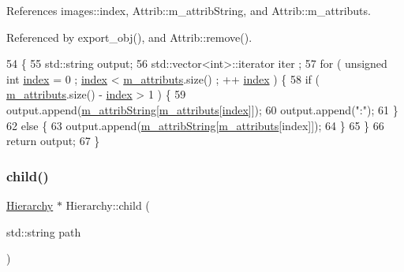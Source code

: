References images\+::index, Attrib\+::m\+\_\+attrib\+String, and Attrib\+::m\+\_\+attributs.



Referenced by export\+\_\+obj(), and Attrib\+::remove().


\begin{DoxyCode}
54                             \{
55   std::string output;
56   std::vector<int>::iterator iter ;
57   \textcolor{keywordflow}{for} ( \textcolor{keywordtype}{unsigned} \textcolor{keywordtype}{int} \hyperlink{namespaceimages_a54407fd574970b3178647ae096321a57}{index} = 0 ; \hyperlink{namespaceimages_a54407fd574970b3178647ae096321a57}{index} < \hyperlink{classAttrib_ac4bd58a0cc6b38a3b711d609a3d3aacc}{m\_attributs}.size() ; ++
      \hyperlink{namespaceimages_a54407fd574970b3178647ae096321a57}{index} ) \{
58     \textcolor{keywordflow}{if} ( \hyperlink{classAttrib_ac4bd58a0cc6b38a3b711d609a3d3aacc}{m\_attributs}.size() - \hyperlink{namespaceimages_a54407fd574970b3178647ae096321a57}{index} > 1 ) \{
59       output.append(\hyperlink{classAttrib_a3414521d7a82476e874b25a5407b5e63}{m\_attribString}[\hyperlink{classAttrib_ac4bd58a0cc6b38a3b711d609a3d3aacc}{m\_attributs}[\hyperlink{namespaceimages_a54407fd574970b3178647ae096321a57}{index}]]);
60       output.append(\textcolor{stringliteral}{":"});
61     \}
62     \textcolor{keywordflow}{else} \{
63       output.append(\hyperlink{classAttrib_a3414521d7a82476e874b25a5407b5e63}{m\_attribString}[\hyperlink{classAttrib_ac4bd58a0cc6b38a3b711d609a3d3aacc}{m\_attributs}[index]]);
64     \}
65   \}
66   \textcolor{keywordflow}{return} output;
67 \}
\end{DoxyCode}
\mbox{\label{classHierarchy_a1e207f973c694b538bf90107b4868817}} 
\subsubsection{\texorpdfstring{child()}{child()}}
{\footnotesize\ttfamily \hyperlink{classHierarchy}{Hierarchy} $\ast$ Hierarchy\+::child (\begin{DoxyParamCaption}\item[{std\+::string}]{path }\end{DoxyParamCaption})\hspace{0.3cm}{\ttfamily [inherited]}}



